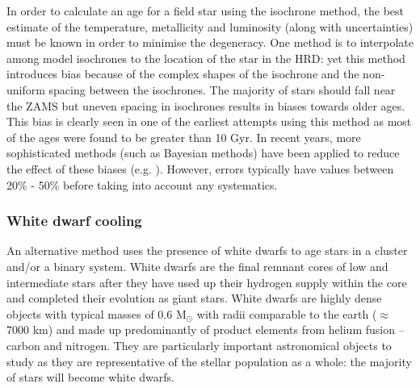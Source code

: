 In order to calculate an age for a field star using the isochrone method, the best estimate of the temperature, metallicity and luminosity (along with uncertainties) must be known in order to minimise the degeneracy. One method is to interpolate among model isochrones to the location of the star in the HRD: yet this method introduces bias because of the complex shapes of the isochrone and the non-uniform spacing between the isochrones. The majority of stars should fall near the ZAMS but uneven spacing in isochrones results in biases towards older ages. This bias is clearly seen in one of the earliest attempts using this method \citep{Perrin_etal_1977} as most of the ages were found to be greater than 10 Gyr. In recent years, more sophisticated methods (such as Bayesian methods) have been applied  to reduce the effect of these biases (e.g. \citealt{Takeda_etal_2007}). However, errors typically have values between 20\% - 50\% before taking into account any systematics.

\subsubsection{White dwarf cooling}
An alternative method uses the presence of white dwarfs to age stars in a cluster and/or a binary system. White dwarfs are the final remnant cores of low and intermediate stars after they have used up their hydrogen supply within the core and completed their evolution as giant stars. White dwarfs are highly dense objects with typical masses of 0.6 M$_{\odot}$ with radii comparable to the earth ($\approx$ 7000 km) \citep{Madej_etal_2004} and made up predominantly of product elements from helium fusion -- carbon and nitrogen. They are particularly important astronomical objects to study as they are representative of the stellar population as a whole: the majority of stars will become white dwarfs.

